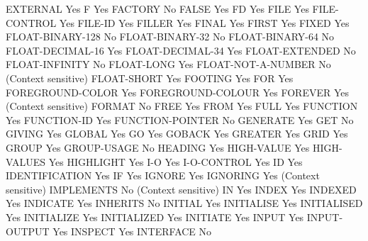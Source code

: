 EXTERNAL                        Yes
F                               Yes
FACTORY                         No
FALSE                           Yes
FD                              Yes
FILE                            Yes
FILE-CONTROL                    Yes
FILE-ID                         Yes
FILLER                          Yes
FINAL                           Yes
FIRST                           Yes
FIXED                           Yes
FLOAT-BINARY-128                No
FLOAT-BINARY-32                 No
FLOAT-BINARY-64                 No
FLOAT-DECIMAL-16                Yes
FLOAT-DECIMAL-34                Yes
FLOAT-EXTENDED                  No
FLOAT-INFINITY                  No
FLOAT-LONG                      Yes
FLOAT-NOT-A-NUMBER              No (Context sensitive)
FLOAT-SHORT                     Yes
FOOTING                         Yes
FOR                             Yes
FOREGROUND-COLOR                Yes
FOREGROUND-COLOUR               Yes
FOREVER                         Yes (Context sensitive)
FORMAT                          No
FREE                            Yes
FROM                            Yes
FULL                            Yes
FUNCTION                        Yes
FUNCTION-ID                     Yes
FUNCTION-POINTER                No
GENERATE                        Yes
GET                             No
GIVING                          Yes
GLOBAL                          Yes
GO                              Yes
GOBACK                          Yes
GREATER                         Yes
GRID                            Yes
GROUP                           Yes
GROUP-USAGE                     No
HEADING                         Yes
HIGH-VALUE                      Yes
HIGH-VALUES                     Yes
HIGHLIGHT                       Yes
I-O                             Yes
I-O-CONTROL                     Yes
ID                              Yes
IDENTIFICATION                  Yes
IF                              Yes
IGNORE                          Yes
IGNORING                        Yes (Context sensitive)
IMPLEMENTS                      No (Context sensitive)
IN                              Yes
INDEX                           Yes
INDEXED                         Yes
INDICATE                        Yes
INHERITS                        No
INITIAL                         Yes
INITIALISE                      Yes
INITIALISED                     Yes
INITIALIZE                      Yes
INITIALIZED                     Yes
INITIATE                        Yes
INPUT                           Yes
INPUT-OUTPUT                    Yes
INSPECT                         Yes
INTERFACE                       No
